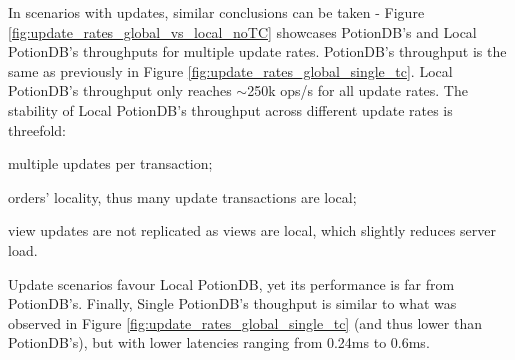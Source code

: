 \documentclass[sigplan,review,anonymous]{acmart}
\begin{document}
In scenarios with updates, similar conclusions can be taken - Figure \ref{fig:update_rates_global_vs_local_noTC} showcases PotionDB's and Local PotionDB's throughputs for multiple update rates.
PotionDB's throughput is the same as previously in Figure \ref{fig:update_rates_global_single_tc}.
Local PotionDB's throughput only reaches $\sim$250k ops/s for all update rates.
The stability of Local PotionDB's throughput across different update rates is threefold:
\begin{enumerate*}[label=(\roman*)]
	\item multiple updates per transaction;%
	\item orders' locality, thus many update transactions are local;
	\item view updates are not replicated as views are local, which slightly reduces server load. %
\end{enumerate*} %
Update scenarios favour Local PotionDB, yet its performance is far from PotionDB's.
Finally, Single PotionDB's thoughput is similar to what was observed in Figure \ref{fig:update_rates_global_single_tc} (and thus lower than PotionDB's), but with lower latencies ranging from 0.24ms to 0.6ms.
\end{document}
